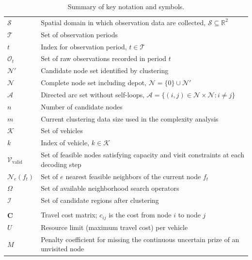 \documentclass[preprint,12pt,authoryear]{elsarticle}
\theoremstyle{definition}
\begin{document}
\begin{table}[htbp]
\caption{Summary of key notation and symbols.}
\label{tab:notation}
\centering
\small
\setlength{\tabcolsep}{4pt}
\renewcommand{\arraystretch}{1.02}
\begin{tabularx}{\textwidth}{@{}>{\raggedright\arraybackslash}p{1.45cm}>{\raggedright\arraybackslash}X@{}}
\toprule
\multicolumn{2}{@{}l}{\textbf{Sets and indices}} \\
\midrule
$\mathcal{S}$ & Spatial domain in which observation data are collected, $\mathcal{S} \subseteq \mathbb{R}^2$ \\
$\mathcal{T}$ & Set of observation periods \\
$t$ & Index for observation period, $t \in \mathcal{T}$ \\
$\mathcal{O}_t$ & Set of raw observations recorded in period $t$ \\
$\mathcal{N}'$ & Candidate node set identified by clustering \\
$\mathcal{N}$ & Complete node set including depot, $\mathcal{N}=\{0\}\cup\mathcal{N}'$ \\
$\mathcal{A}$ & Directed arc set without self-loops, $\mathcal{A}=\{(i,j)\in\mathcal{N}\times\mathcal{N}:i\neq j\}$ \\
$n$ & Number of candidate nodes \\
$m$ & Current clustering data size used in the  complexity analysis \\
$\mathcal{K}$ & Set of vehicles \\
$k$ & Index of vehicle, $k \in \mathcal{K}$ \\
$\mathcal{V}_{\mathrm{valid}}$ & Set of feasible nodes satisfying capacity and visit constraints at each decoding step \\
$\mathcal{N}_e(f_t)$ & Set of $e$ nearest feasible neighbors of the current node $f_t$ \\
$\Omega$ & Set of available neighborhood search operators \\
$\mathcal{I}$ & Set of candidate regions after clustering \\
\midrule
\multicolumn{2}{@{}l}{\textbf{Problem parameters}} \\
\midrule
$\bm{C}$ & Travel cost matrix; $c_{ij}$ is the cost from node $i$ to node $j$ \\
$U$ & Resource limit (maximum travel cost) per vehicle \\
$M$ & Penalty coefficient for missing the continuous uncertain prize of an unvisited node \\

\end{tabularx}
\end{table}
\end{document}
